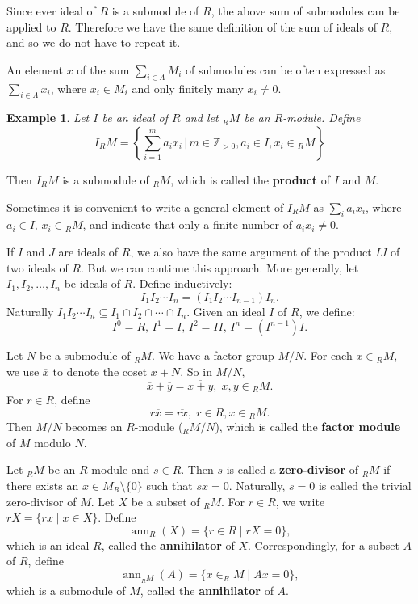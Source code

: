 \documentclass[12pt,reqno]{amsart}
\theoremstyle{plain}
\newtheorem{rem}{Remark}
\DeclareMathOperator{\ann}{ann}
\newtheorem{ex}{Example}
\newcommand{\zz}{\mathbb Z}
\newcommand{\idealA}{\mathfrak{A}}
\begin{document}
Since ever ideal of $R$ is a submodule of $R$, the above sum of submodules can be applied to $R$.  Therefore we have the same definition of the sum of ideals of $R$, and so we do not have to repeat it. 

An element $x$ of the sum $\sum_{i \in \Lambda} M_i$ of submodules can be often expressed as $\sum_{i \in \Lambda} x_i$, where $x_i \in M_i$ and only finitely many $x_i \neq 0$.
\begin{ex} Let $I$ be an ideal of $R$ and let $_RM$ be an $R$-module.  Define \[ I {_RM} = \left \{ \sum_{i=1}^m a_i x_i \, \Big | \, m\in \zz_{>0}, a_i \in I, x_i \in {_RM} \right \} \]
\end{ex}
Then $I {_RM}$ is a submodule of $_RM$, which is called the \textbf{product} of $I$ and $M$.

Sometimes it is convenient to write a general element of $I {_RM}$ as $\sum_i a_i x_i$, where $a_i \in I$,  $x_i \in {_RM}$,  and indicate that only a finite number of $a_i x_i \neq 0 $. 

If $I$ and $J$ are ideals of $R$, we also have the same argument of the product $IJ$ of two ideals of $R$. But we can continue this approach.  More generally,  let $I_1, I_2, \ldots, I_n$ be ideals of $R$.  Define inductively: \[I_1 I_2 \cdots I_n = (I_1 I_2 \cdots I_{n-1}) I_n. \] Naturally $I_1 I_2 \cdots I_n \subseteq I_1 \cap I_2 \cap \cdots \cap I_n$.  Given an ideal $I$ of $R$, we define: \[I^0 = R, \, I^1 = I,  \, I^2 = I I , \, I^n = (I^{n-1}) I. \]

Let $N$ be a submodule of $_RM$. We have a factor group $M/N$.  For each $x \in {_RM}$, we use $\overline{x}$ to denote the coset $x + N$.  So in $M/N$,  \[\overline{x}+ \overline{y} = \overline{x+y}, \; x, y \in {_RM}. \]
For $ r \in R$, define \[ r\overline{x} = \overline{rx}, \; r \in R, x \in {_RM} .\]
Then $M/N$ becomes an $R$-module ($_R M/N$), which is called the \textbf{factor module} of $M$ modulo $N$. 

Let $_RM$ be an $R$-module and $s \in R$. Then $s$ is called a \textbf{zero-divisor} of $_RM$ if there exists an $x \in M_R \setminus \{ 0 \}$ such that $sx = 0$. Naturally, $s=0$ is called the trivial zero-divisor of $M$. Let $X$ be a subset of $_RM$. For $r \in R$, we write $rX = \{ rx \mid x \in X \}$.  Define \[ \ann_R (X) = \{ r \in R \mid rX = 0 \} ,\]which is an ideal $R$, called the \textbf{annihilator} of $X$. Correspondingly, for a subset $A$ of $R$, define \[ \ann_{_RM} (A) = \{ x \in _RM \mid Ax = 0 \}, \] which is a submodule of $M$, called the \textbf{annihilator} of $A$. 
\end{document}
